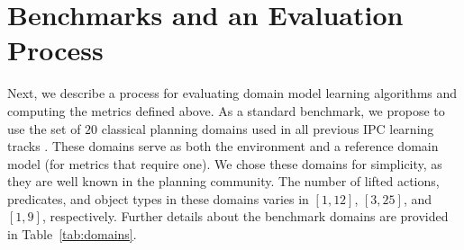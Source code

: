 

\section{Benchmarks and an Evaluation Process}






Next, we describe a process for evaluating domain model learning algorithms 
and computing the metrics defined above. %
%
As a standard benchmark, we propose to use the set of $20$ classical planning domains used in all previous IPC learning tracks \citep{fern2011first, vallati20152014, taitler20242023}. 
These domains serve as both the environment and a reference domain model (for metrics that require one). 
We chose these domains for simplicity, as they are well known in the planning community. 
The number of lifted actions, predicates, and object types in these domains varies in 
$[1, 12]$, $[3,25]$, and $[1, 9]$, respectively.
Further details about the benchmark domains are provided in Table~\ref{tab:domains}. 

%
